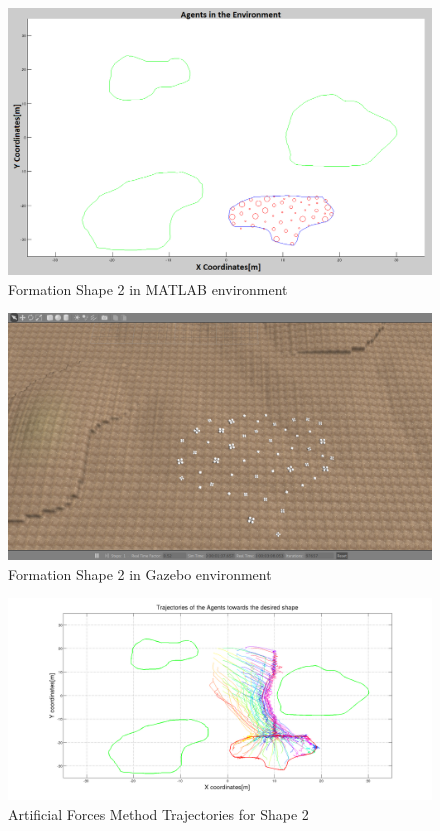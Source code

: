 \begin{figure}[H]
\caption{Formation Shape 2 in MATLAB environment}
\centerline{\includegraphics[scale = 0.32]{Trajectories_Formation_Shape_2_2}}
\end{figure} 	
		   
\begin{figure}[H]
\caption{Formation Shape 2 in Gazebo environment}
\centerline{\includegraphics[scale = 0.32]{Trajectories_Formation_Shape_2_1}}
\end{figure} 	
		   
\begin{figure}[H]
\caption{Artificial Forces Method Trajectories for Shape 2} \label{arto2}
\centerline{\includegraphics[scale = 0.32]{Artificial_Trajectories_2}}
\end{figure} 	


